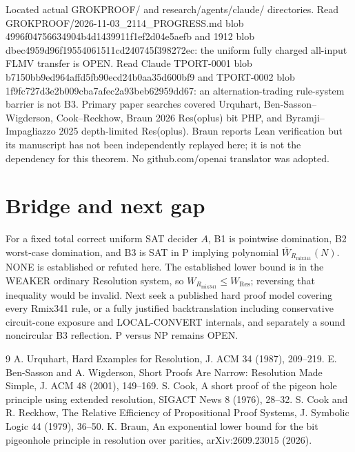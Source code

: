 \documentclass[11pt]{article}
\begin{document}
Located actual GROKPROOF/ and research/agents/claude/ directories. Read GROKPROOF/2026-11-03_2114_PROGRESS.md blob 4996f04756634904b4d1439911f1ef2d04e5aefb and 1912 blob dbec4959d96f19554061511cd240745f398272ec: the uniform fully charged all-input FLMV transfer is OPEN. Read Claude TPORT-0001 blob b7150bb9ed964affd5fb90ecd24b0aa35d600bf9 and TPORT-0002 blob 1f9fc727d3e2b009cba7afec2a93beb62959dd67: an alternation-trading rule-system barrier is not B3. Primary paper searches covered Urquhart, Ben-Sasson--Wigderson, Cook--Reckhow, Braun 2026 Res(oplus) bit PHP, and Byramji--Impagliazzo 2025 depth-limited Res(oplus). Braun reports Lean verification but its manuscript has not been independently replayed here; it is not the dependency for this theorem. No github.com/openai translator was adopted.

\section*{Bridge and next gap}
For a fixed total correct uniform SAT decider \(A\), B1 is pointwise domination, B2 worst-case domination, and B3 is SAT in P implying polynomial \(\overline W_{R_{\mathrm{mix341}}}(N)\). NONE is established or refuted here. The established lower bound is in the WEAKER ordinary Resolution system, so \(W_{R_{\mathrm{mix341}}}\le W_{\mathrm{Res}}\); reversing that inequality would be invalid. Next seek a published hard proof model covering every Rmix341 rule, or a fully justified backtranslation including conservative circuit-cone exposure and LOCAL-CONVERT internals, and separately a sound noncircular B3 reflection. P versus NP remains OPEN.

\begin{thebibliography}{9}
 A. Urquhart, Hard Examples for Resolution, J. ACM 34 (1987), 209--219.
 E. Ben-Sasson and A. Wigderson, Short Proofs Are Narrow: Resolution Made Simple, J. ACM 48 (2001), 149--169.
 S. Cook, A short proof of the pigeon hole principle using extended resolution, SIGACT News 8 (1976), 28--32.
 S. Cook and R. Reckhow, The Relative Efficiency of Propositional Proof Systems, J. Symbolic Logic 44 (1979), 36--50.
 K. Braun, An exponential lower bound for the bit pigeonhole principle in resolution over parities, arXiv:2609.23015 (2026).
\end{thebibliography}
\end{document}
